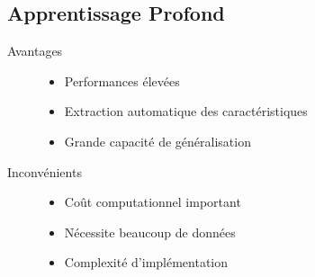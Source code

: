 \subsection{Apprentissage Profond}
\begin{description}
    \item[Avantages]
        \begin{itemize}
            \item Performances élevées
            \item Extraction automatique des caractéristiques
            \item Grande capacité de généralisation
        \end{itemize}
    \item[Inconvénients]
        \begin{itemize}
            \item Coût computationnel important
            \item Nécessite beaucoup de données
            \item Complexité d'implémentation
        \end{itemize}
\end{description}